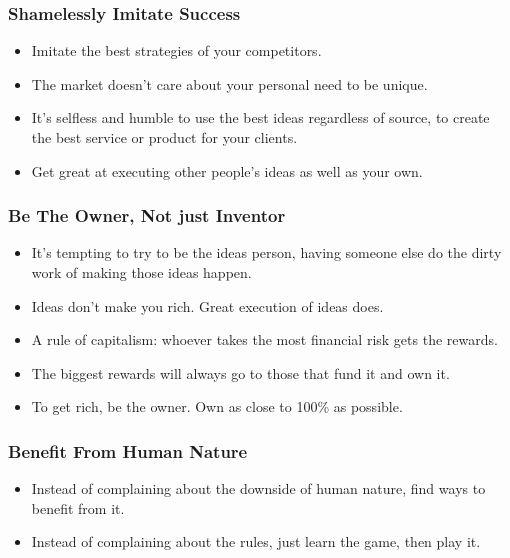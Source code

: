 \begin{frame}[fragile]\frametitle{Shamelessly Imitate Success}

\begin{itemize}
\item Imitate the best strategies of your competitors.
\item The market doesn’t care about your personal need to be unique.
\item It’s selfless and humble to use the best ideas regardless of source, to create the best service or product for your clients.
\item Get great at executing other people’s ideas as well as your own.
\end{itemize}

\end{frame}

\begin{frame}[fragile]\frametitle{Be The Owner, Not just Inventor}

\begin{itemize}
\item It’s tempting to try to be the ideas person, having someone else do the dirty work of making those ideas happen.
\item Ideas don’t make you rich. Great execution of ideas does.
\item A rule of capitalism: whoever takes the most financial risk gets the rewards.
\item The biggest rewards will always go to those that fund it and own it.
\item To get rich, be the owner. Own as close to 100\% as possible.
\end{itemize}

\end{frame}

\begin{frame}[fragile]\frametitle{Benefit From Human Nature}

\begin{itemize}
\item Instead of complaining about the downside of human nature, find ways to benefit from it.
\item Instead of complaining about the rules, just learn the game, then play it.
\end{itemize}

\end{frame}


